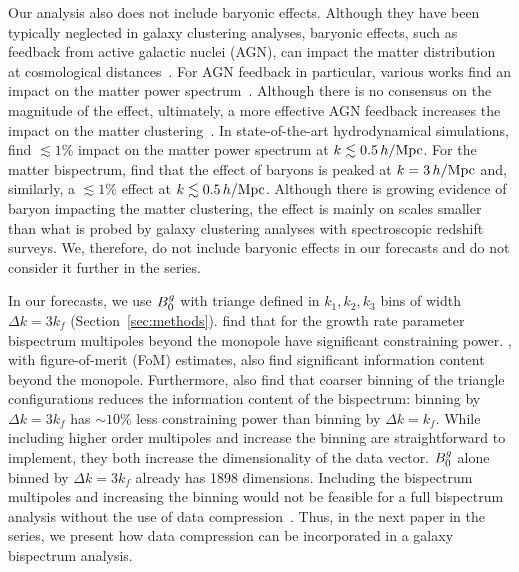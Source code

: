 Our analysis also does not include baryonic effects. Although they have been 
typically neglected in galaxy clustering analyses, baryonic effects, such as
feedback from active galactic nuclei (AGN), can impact the matter distribution
at cosmological distances~\citep[\eg][]{white2004, zhan2004, jing2006,
rudd2008, harnois-deraps2015}. %
For AGN feedback in particular, various works find an impact on the matter 
power spectrum~\citep[\eg][]{vandaalen2011, vogelsberger2014, hellwing2016, peters2018,
springel2018, chisari2018, vandaalen2020}. %
Although there is no consensus on the magnitude of the effect, ultimately, a 
more effective AGN feedback increases the impact on the matter 
clustering~\citep{barreira2019}. In state-of-the-art hydrodynamical simulations,
\cite{foreman2019} find $\lesssim 1\%$ impact on 
the matter power spectrum at $k \lesssim 0.5\,h/\mathrm{Mpc}$. For the matter bispectrum, 
\cite{foreman2019} find that the effect of baryons is peaked at $k=3\,h/\mathrm{Mpc}$ and, 
similarly, a $\lesssim1\%$ effect at $k \lesssim 0.5\,h/\mathrm{Mpc}$. Although there is growing
evidence of baryon impacting the matter clustering, the effect is mainly
on scales smaller than what is probed by galaxy clustering analyses with
spectroscopic redshift surveys. We, therefore, do not include baryonic effects
in our forecasts and do not consider it further in the series. 

In our forecasts, we use $B^g_0$ with triange defined in $k_1,k_2,k_3$ bins of
width $\Delta k = 3 k_f$ (Section~\ref{sec:methods}).
\cite{gagrani2017} find that for the growth rate parameter bispectrum
multipoles beyond the monopole have significant constraining power.  
\cite{yankelevich2019}, with figure-of-merit (FoM) estimates, also find
significant information content beyond the monopole. Furthermore, 
\cite{yankelevich2019} also find that coarser binning of the triangle
configurations reduces the information content of the bispectrum: binning by
$\Delta k = 3 k_f$ has ${\sim}10\%$ less constraining power than binning by
$\Delta k = k_f$. While including higher order multipoles and increase the binning 
are straightforward to implement, they both increase the dimensionality of the 
data vector. $B^g_0$ alone binned by $\Delta k = 3 k_f$ already has 1898
dimensions. Including the bispectrum multipoles and increasing the
binning would not be feasible for a full bispectrum analysis without the use of data
compression~\citep[\eg][]{byun2017, gualdi2018, gualdi2019a, gualdi2019}. 
Thus, in the next paper in the series, we present how data compression can be
incorporated in a galaxy bispectrum analysis.

